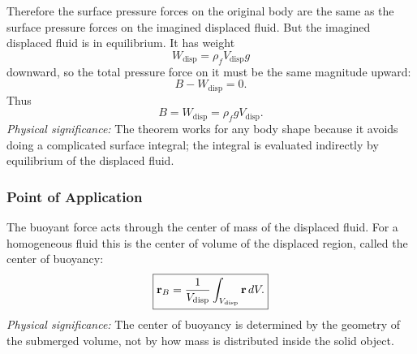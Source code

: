 \documentclass[../main.tex]{subfiles}
\begin{document}
Therefore the surface pressure forces on the original body are the same as the surface pressure forces on the imagined displaced fluid. But the imagined displaced fluid is in equilibrium. It has weight
\begin{equation}
  W_{\mathrm{disp}}=\rho_f V_{\mathrm{disp}}g
  \label{eq:lec11_displaced_weight}
\end{equation}
downward, so the total pressure force on it must be the same magnitude upward:
\begin{equation}
  B-W_{\mathrm{disp}}=0.
  \label{eq:lec11_displaced_equilibrium}
\end{equation}
Thus
\begin{equation}
  \boxed{B=W_{\mathrm{disp}}=\rho_f gV_{\mathrm{disp}}.}
  \label{eq:lec11_archimedes_proof_result}
\end{equation}
\textit{Physical significance:} The theorem works for any body shape because it avoids doing a complicated surface integral; the integral is evaluated indirectly by equilibrium of the displaced fluid.

\begin{center}
\end{center}

\subsubsection{Point of Application}\label{subsec:lec11:center-of-buoyancy}
The buoyant force acts through the center of mass of the displaced fluid. For a homogeneous fluid this is the center of volume of the displaced region, called the center of buoyancy:
\begin{equation}
  \boxed{\mathbf{r}_B
  =
  \frac{1}{V_{\mathrm{disp}}}\int_{V_{\mathrm{disp}}}\mathbf{r}\,dV.}
  \label{eq:lec11_center_buoyancy}
\end{equation}
\textit{Physical significance:} The center of buoyancy is determined by the geometry of the submerged volume, not by how mass is distributed inside the solid object.
\end{document}
